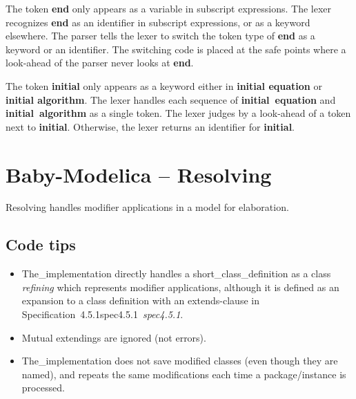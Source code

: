 \documentclass[10pt,b5paper]{article}
\def\specrefx#1#2{Specification~#1\ifx\relax#2\relax{}\else~{\it{}#2}\fi}
\def\specref#1{\specrefx{#1}{\csname spec#1\endcsname}}
\begin{document}
The token {\bf{}end} only appears as a variable in subscript
expressions.  The lexer recognizes {\bf{}end} as an identifier in
subscript expressions, or as a keyword elsewhere.  The parser tells
the lexer to switch the token type of {\bf{}end} as a keyword or an
identifier.  The switching code is placed at the safe points where a
look-ahead of the parser never looks at {\bf{}end}.

The token {\bf{}initial} only appears as a keyword either in
{\bf{}initial equation} or {\bf{}initial algorithm}.  The lexer
handles each sequence of {\bf{}initial~equation} and
{\bf{}initial~algorithm} as a single token.  The lexer judges by a
look-ahead of a token next to {\bf{}initial}.  Otherwise, the lexer
returns an identifier for {\bf{}initial}.


\section{Baby-Modelica -- Resolving}

{Resolving} handles modifier applications in a model for elaboration.


\subsection{Code tips}

\begin{itemize}

\item The_implementation directly handles a short_class_definition as
a class {\it{}refining\/} which represents modifier applications,
although it is defined as an expansion to a class definition with an
extends-clause in \specref{4.5.1}.

\item Mutual extendings are ignored (not errors).

\item The_implementation does not save modified classes (even though
they are named), and repeats the same modifications each time a
package/instance is processed.


\end{itemize}
\end{document}
